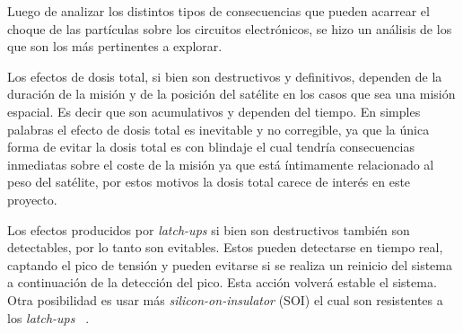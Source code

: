 \documentclass[a4paper,openright,12pt]{report}
\begin{document}
Luego de analizar los distintos tipos de consecuencias que pueden acarrear el choque de las partículas sobre los circuitos electrónicos, se hizo un análisis de los que son los más pertinentes a explorar.

Los efectos de dosis total, si bien son destructivos y definitivos, dependen de la duración de la misión y de la posición del satélite en los casos que sea una misión espacial. Es decir que son acumulativos y dependen del tiempo. 
En simples palabras el efecto de dosis total es inevitable y no corregible, ya que la única forma de evitar la dosis total es con blindaje el cual tendría consecuencias inmediatas sobre el coste de la misión ya que está íntimamente relacionado al peso del satélite, por estos motivos la dosis total  carece de interés en este proyecto.

Los efectos producidos por \textit{latch-ups} si bien son destructivos también son detectables, por lo tanto son evitables. Estos pueden detectarse en tiempo real, captando el pico de tensión y pueden evitarse si se realiza  un reinicio del sistema a continuación de la detección del pico. Esta acción  volverá estable el sistema.
Otra posibilidad es usar más \textit{silicon-on-insulator} (SOI) el cual son resistentes a los \textit{latch-ups} ~\cite{340569}.
\end{document}
